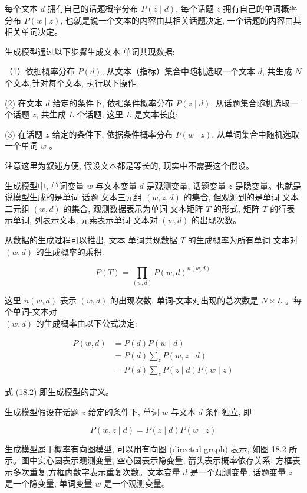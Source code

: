 \documentclass[10pt]{article}
\begin{document}
每个文本 $d$ 拥有自己的话题概率分布 $P(z \mid d)$, 每个话题 $z$ 拥有自己的单词概率分布 $P(w \mid z)$, 也就是说一个文本的内容由其相关话题决定, 一个话题的内容由其相关单词决定。

生成模型通过以下步骤生成文本-单词共现数据:

（1）依据概率分布 $P(d)$, 从文本（指标）集合中随机选取一个文本 $d$, 共生成 $N$ 个文本,针对每个文本, 执行以下操作;

(2) 在文本 $d$ 给定的条件下, 依据条件概率分布 $P(z \mid d)$, 从话题集合随机选取一个话题 $z$, 共生成 $L$ 个话题, 这里 $L$ 是文本长度;

(3) 在话题 $z$ 给定的条件下, 依据条件概率分布 $P(w \mid z)$, 从单词集合中随机选取一个单词 $w$ 。

注意这里为叙述方便, 假设文本都是等长的, 现实中不需要这个假设。

生成模型中, 单词变量 $w$ 与文本变量 $d$ 是观测变量, 话题变量 $z$ 是隐变量。也就是说模型生成的是单词-话题-文本三元组 $(w, z, d)$ 的集合, 但观测到的是单词-文本二元组 $(w, d)$ 的集合, 观测数据表示为单词-文本矩阵 $T$ 的形式, 矩阵 $T$ 的行表示单词, 列表示文本, 元素表示单词-文本对 $(w, d)$ 的出现次数。

从数据的生成过程可以推出, 文本-单词共现数据 $T$ 的生成概率为所有单词-文本对 $(w, d)$ 的生成概率的乘积:


\begin{equation*}
P(T)=\prod_{(w, d)} P(w, d)^{n(w, d)} \tag{18.1}
\end{equation*}


这里 $n(w, d)$ 表示 $(w, d)$ 的出现次数, 单词-文本对出现的总次数是 $N \times L$ 。每个单词-文本对\\
$(w, d)$ 的生成概率由以下公式决定:


\begin{align*}
P(w, d) & =P(d) P(w \mid d) \\
& =P(d) \sum_{z} P(w, z \mid d) \\
& =P(d) \sum_{z} P(z \mid d) P(w \mid z) \tag{18.2}
\end{align*}


式 (18.2) 即生成模型的定义。

生成模型假设在话题 $z$ 给定的条件下, 单词 $w$ 与文本 $d$ 条件独立, 即


\begin{equation*}
P(w, z \mid d)=P(z \mid d) P(w \mid z) \tag{18.3}
\end{equation*}


生成模型属于概率有向图模型, 可以用有向图 (directed graph) 表示, 如图 18.2 所示。图中实心圆表示观测变量, 空心圆表示隐变量, 箭头表示概率依存关系, 方框表示多次重复,方框内数字表示重复次数。文本变量 $d$ 是一个观测变量, 话题变量 $z$ 是一个隐变量, 单词变量 $w$ 是一个观测变量。
\end{document}
